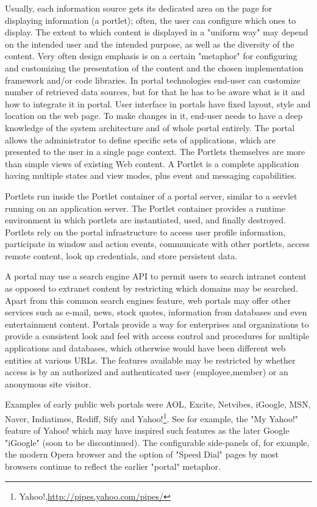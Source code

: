 		Usually, each information source gets its dedicated area on the page for displaying information (a portlet); often, the user can configure which ones to display. The extent to which content is displayed in a "uniform way" may depend on the intended user and the intended purpose, as well as the diversity of the content. Very often design emphasis is on a certain "metaphor" for configuring and customizing the presentation of the content and the chosen implementation framework and/or code libraries\cite{pautasso2008restful,seong2006usability}. In portal technologies end-user can customize number of retrieved data sources, but for that he has to be aware what is it and how to integrate it in portal. User interface in portals have fixed layout, style and location on the web page. To make changes in it, end-user needs to have a deep knowledge of the system architecture and of whole portal entirely. The portal allows the administrator to define specific sets of applications, which are presented to the user in a single page context. The Portlets themselves are more than simple views of existing Web content. A Portlet is a complete application having multiple states and view modes, plus event and messaging capabilities.

		Portlets run inside the Portlet container of a portal server, similar to a servlet running on an application server. The Portlet container provides a runtime environment in which portlets are instantiated, used, and finally destroyed. Portlets rely on the portal infrastructure to access user profile information, participate in window and action events, communicate with other portlets, access remote content, look up credentials, and store persistent data.

		A portal may use a search engine API to permit users to search intranet content as opposed to extranet content by restricting which domains may be searched. Apart from this common search engines feature, web portals may offer other services such as e-mail, news, stock quotes, information from databases and even entertainment content. Portals provide a way for enterprises and organizations to provide a consistent look and feel with access control and procedures for multiple applications and databases, which otherwise would have been different web entities at various URLs. The features available may be restricted by whether access is by an authorized and authenticated user (employee,member) or an anonymous site visitor.

		Examples of early public web portals were AOL, Excite, Netvibes, iGoogle, MSN, Naver, Indiatimes, Rediff, Sify and Yahoo!\footnote{Yahoo!,\url{http://pipes.yahoo.com/pipes/}}. See for example, the "My Yahoo!" feature of Yahoo! which may have inspired such features as the later Google "iGoogle" (soon to be discontinued). The configurable side-panels of, for example, the modern Opera browser and the option of "Speed Dial" pages by most browsers continue to reflect the earlier "portal" metaphor.


